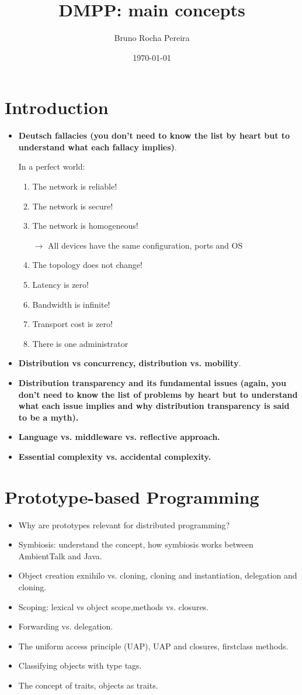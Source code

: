 \documentclass[a4paper]{report}
\title{DMPP: main concepts}
\author{Bruno Rocha Pereira}
\date{\today}
\begin{document}
\maketitle
\chapter{Introduction}
\begin{itemize}
  \item \textbf{Deutsch fallacies (you don’t need to know the list by heart but to understand what
  each fallacy implies)}.
  
  
  
  In a perfect world:
  \begin{enumerate}
	\item The network is reliable!
    \item The network is secure!
    \item The network is homogeneous!
    
	$\rightarrow $ All devices have the same configuration, ports and OS
    \item The topology does not change!
    \item Latency is zero!
    \item Bandwidth is infinite!
    \item Transport cost is zero!
    \item There is one administrator
\end{enumerate}
  \item \textbf{Distribution vs concurrency, distribution vs. mobility}.
  \item \textbf{Distribution transparency and its fundamental issues (again, you don’t need to know
  the list of problems by heart but to understand what each issue implies and why
  distribution transparency is said to be a myth).}
  \item \textbf{Language vs. middleware vs. reflective approach.}
  \item \textbf{Essential complexity vs. accidental complexity.}
\end{itemize}
\chapter{Prototype-based Programming}
\begin{itemize}
\item Why are prototypes relevant for distributed programming?
\item  Symbiosis: understand the concept, how symbiosis works between AmbientTalk and
Java.
\item Object creation exnihilo vs. cloning, cloning and instantiation, delegation and cloning.
\item Scoping: lexical vs object scope,methods vs. closures.
\item Forwarding vs. delegation.
\item The uniform access principle (UAP), UAP and closures, firstclass methods.
\item Classifying objects with type tags.
\item The concept of traits, objects as traits.
\end{itemize}
\end{document}
